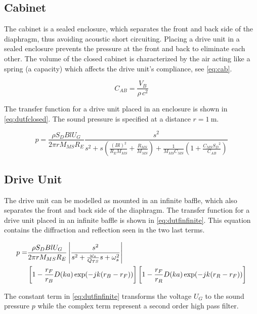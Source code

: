 \subsection{Cabinet}
The cabinet is a sealed enclosure, which separates the front and back side of the diaphragm, thus avoiding acoustic short circuiting. 
Placing a drive unit in a sealed enclosure prevents the pressure at the front and back to eliminate each other. \cite[p.~44]{Elektroakustik}  
The volume of the closed cabinet is characterized by the air acting like a spring (a capacity) which affects the drive unit's compliance, see \cref{eq:cab}. 

\begin{equation}
C_{AB} = \frac{V_B}{\rho \,c^2}
\label{eq:cab}
\end{equation} 

The transfer function for a drive unit placed in an enclosure is shown in \cref{eq:dutfclosed}.
The sound pressure is specified at a distance $r=\SI{1}{\meter}$. 

\begin{equation}
p = \frac{\rho S_D B l U_G}{2\pi r M_{MS} R_E}\frac{s^2}{s^2 +s \left(\frac{(Bl)^2}{R_EM_{MS}}+\frac{R_{MS}}{M_{MS}}\right)+\frac{1}{M_{MS}C_{MS}}\left(1+\frac{C_{MS}{S_D}^2}{C_{AB}}\right)}
\label{eq:dutfclosed}
\end{equation}

\subsection{Drive Unit}
\label{seq:driveunit}
The drive unit can be modelled as mounted in an infinite baffle, which also separates the front and back side of the diaphragm.
The transfer function for a drive unit placed in an infinite baffle is shown in \cref{eq:dutfinfinite}. This equation contains the diffraction and reflection seen in the two last terms.


\begin{align}
	p =& \frac{\rho S_D B l U_G}{2\pi r M_{MS} R_E}\left|\frac{s^2}{s^2 + \frac{\omega_s}{Q_{TS}}s+\omega_s^2}\right| \label{eq:dutfinfinite} \\
	& \left[1-\frac{r_F}{r_B}D(ka)\exp(-jk(r_B-r_F))\right] \left[1-\frac{r_F}{r_R}D(ka)\exp(-jk(r_R-r_F))\right]\notag
\end{align}

The constant term in \cref{eq:dutfinfinite} transforms the voltage $U_G$ to the sound pressure $p$ while the complex term represent a second order high pass filter.\\

